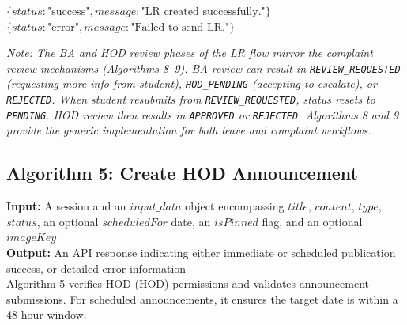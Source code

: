 \begin{algorithm}[H]
\begin{algorithmic}[1]
        \State \Return $\{status: \text{"success"}, message: \text{"LR created successfully."}\}$
    \Else
        \State \Return $\{status: \text{"error"}, message: \text{"Failed to send LR."}\}$
    \EndIf

\EndFunction

\end{algorithmic}
\end{algorithm}

\textit{Note: The BA and HOD review phases of the LR flow mirror the complaint review mechanisms (Algorithms 8–9). BA review can result in \texttt{REVIEW\_REQUESTED} (requesting more info from student), \texttt{HOD\_PENDING} (accepting to escalate), or \texttt{REJECTED}. When student resubmits from \texttt{REVIEW\_REQUESTED}, status resets to \texttt{PENDING}. HOD review then results in \texttt{APPROVED} or \texttt{REJECTED}. Algorithms 8 and 9 provide the generic implementation for both leave and complaint workflows.}


\subsection{Algorithm 5: Create HOD Announcement}

\textbf{Input:} A session and an $input\_data$ object encompassing $title$, $content$, $type$, $status$, an optional $scheduledFor$ date, an $isPinned$ flag, and an optional $imageKey$ \\
\textbf{Output:} An API response indicating either immediate or scheduled publication success, or detailed error information \\

Algorithm 5 verifies HOD (HOD) permissions and validates announcement submissions. For scheduled announcements, it ensures the target date is within a 48-hour window.


